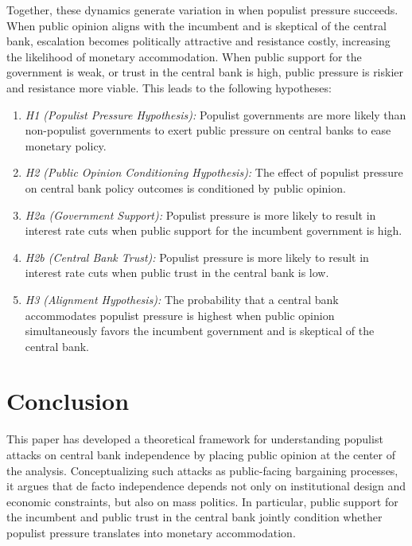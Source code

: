 \documentclass[
  11pt,
  letterpaper,
  DIV=11,
  numbers=noendperiod]{scrartcl}
\begin{document}
Together, these dynamics generate variation in when populist pressure
succeeds. When public opinion aligns with the incumbent and is skeptical
of the central bank, escalation becomes politically attractive and
resistance costly, increasing the likelihood of monetary accommodation.
When public support for the government is weak, or trust in the central
bank is high, public pressure is riskier and resistance more viable.
This leads to the following hypotheses:

\begin{enumerate}
\def\labelenumi{\arabic{enumi}.}
\item
  \emph{H1 (Populist Pressure Hypothesis):} Populist governments are
  more likely than non-populist governments to exert public pressure on
  central banks to ease monetary policy.
\item
  \emph{H2 (Public Opinion Conditioning Hypothesis):} The effect of
  populist pressure on central bank policy outcomes is conditioned by
  public opinion.
\item
  \emph{H2a (Government Support):} Populist pressure is more likely to
  result in interest rate cuts when public support for the incumbent
  government is high.
\item
  \emph{H2b (Central Bank Trust):} Populist pressure is more likely to
  result in interest rate cuts when public trust in the central bank is
  low.
\item
  \emph{H3 (Alignment Hypothesis):} The probability that a central bank
  accommodates populist pressure is highest when public opinion
  simultaneously favors the incumbent government and is skeptical of the
  central bank.
\end{enumerate}

\section{Conclusion}\label{conclusion}

This paper has developed a theoretical framework for understanding
populist attacks on central bank independence by placing public opinion
at the center of the analysis. Conceptualizing such attacks as
public-facing bargaining processes, it argues that de facto independence
depends not only on institutional design and economic constraints, but
also on mass politics. In particular, public support for the incumbent
and public trust in the central bank jointly condition whether populist
pressure translates into monetary accommodation.
\end{document}
